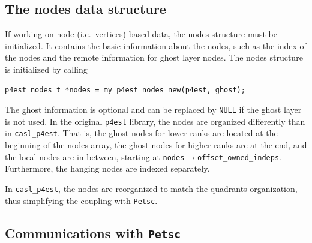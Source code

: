 \documentclass{article}
\newcommand{\ttt}[1]{\texttt{#1}}
\begin{document}
\subsection{The nodes data structure}

If working on node (i.e.\ vertices) based data, the nodes structure must be initialized. It contains the basic information about the nodes, such as the index of the nodes and the remote information for ghost layer nodes. The nodes structure is initialized by calling
\begin{Verbatim}[frame=single]
p4est_nodes_t *nodes = my_p4est_nodes_new(p4est, ghost);
\end{Verbatim}
The ghost information is optional and can be replaced by \ttt{NULL} if the ghost layer is not used. In the original \ttt{p4est} library, the nodes are organized differently than in \ttt{casl\_p4est}. That is, the ghost nodes for lower ranks are located at the beginning of the nodes array, the ghost nodes for higher ranks are at the end, and the local nodes are in between, starting at \ttt{nodes$\rightarrow$offset\_owned\_indeps}. Furthermore, the hanging nodes are indexed separately.

In \ttt{casl\_p4est}, the nodes are reorganized to match the quadrants organization, thus simplifying the coupling with \ttt{Petsc}.

\subsection{Communications with \texttt{Petsc}}
\end{document}

